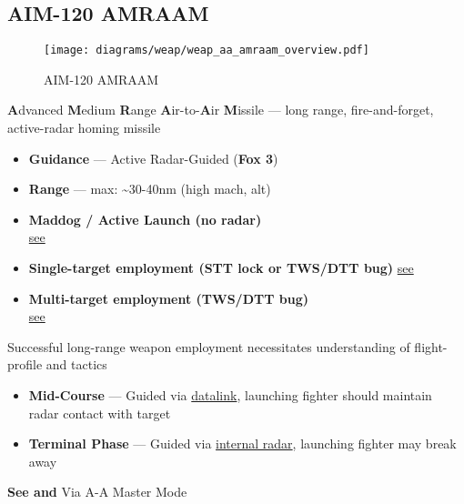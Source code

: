 \subsection{AIM-120 AMRAAM}
\label{subsec:aim120}
\begin{figure}[htbp]
    \centering
    \texttt{[image: diagrams/weap/weap\_aa\_amraam\_overview.pdf]}
    \caption{AIM-120 AMRAAM}
\end{figure}

\begin{tcoloritemize}
    \textbf{A}dvanced \textbf{M}edium \textbf{R}ange \textbf{A}ir-to-\textbf{A}ir \textbf{M}issile
    --- long range, fire-and-forget, active-radar homing missile

    \begin{itemize}
        \item \textbf{Guidance} --- Active Radar-Guided (\textbf{Fox 3})
        \item \textbf{Range} --- max:  \textasciitilde30-40nm (high mach, alt)
    \end{itemize}
    \begin{itemize}
        \item \textbf{Maddog / Active Launch  (no radar)} \\
        \hyperref[subsec:aim120:maddog]{see }
        \item \textbf{Single-target employment (STT lock or TWS/DTT bug)}
        \hyperref[subsec:aim120:single]{see }
        \item \textbf{Multi-target employment (TWS/DTT bug)} \\
        \hyperref[subsec:aim120:multi]{see }
    \end{itemize}
    Successful long-range weapon employment necessitates understanding of flight-profile and tactics
    \begin{itemize}
        \item \textbf{Mid-Course} --- Guided via \underline{datalink}, launching fighter should maintain radar contact with target
        \item \textbf{Terminal Phase} --- Guided via \underline{internal radar}, launching fighter may break away
    \end{itemize}
    
    \textbf{See  and }
    Via A-A Master Mode


\end{tcoloritemize}
